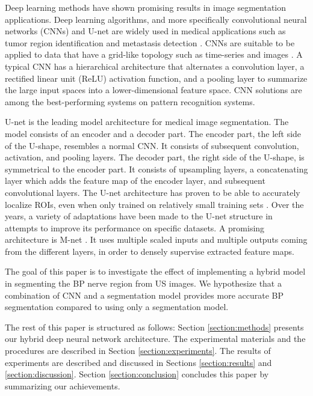 Deep learning methods have shown promising results in image segmentation applications\cite{Wang2019}. Deep learning algorithms, and more specifically convolutional neural networks (CNNs) and U-net are widely used in medical applications such as tumor region identification and metastasis detection \cite{Seetha2018, Kong2017}.
CNNs are suitable to be applied to data that have a grid-like topology such as time-series and images \cite{Goodfellow-et-al-2016}. A typical CNN has a hierarchical architecture that alternates a convolution layer, a rectified linear unit (ReLU) activation function, and a pooling layer to summarize the large input spaces into a lower-dimensional feature space. CNN solutions are among the best-performing systems on pattern recognition systems\cite{Goodfellow-et-al-2016}.

U-net \cite{UNetArticle} is the leading model architecture for medical image segmentation. The model consists of an encoder and a decoder part. The encoder part, the left side of the U-shape, resembles a normal CNN. It consists of subsequent convolution, activation, and pooling layers. The decoder part, the right side of the U-shape, is symmetrical to the encoder part. It consists of upsampling layers, a concatenating layer which adds the feature map of the encoder layer, and subsequent convolutional layers. The U-net architecture has proven to be able to accurately localize ROIs, even when only trained on relatively small training sets \cite{UNetArticle}. Over the years, a variety of adaptations have been made to the U-net structure in attempts to improve its performance on specific datasets. A promising architecture is M-net \cite{MNetArticle}. It uses multiple scaled inputs and multiple outputs coming from the different layers, in order to densely supervise extracted feature maps. 

The goal of this paper is to investigate the effect of implementing a hybrid model in segmenting the BP nerve region from US images. We hypothesize that a combination of CNN and a segmentation model provides more accurate BP segmentation compared to using only a segmentation model.

The rest of this paper is structured as follows: Section \ref{section:methods} presents our hybrid deep neural network architecture. The experimental materials and the procedures are described in Section \ref{section:experiments}. The results of experiments are described and discussed in Sections \ref{section:results} and \ref{section:discussion}. Section \ref{section:conclusion} concludes this paper by summarizing our achievements.

